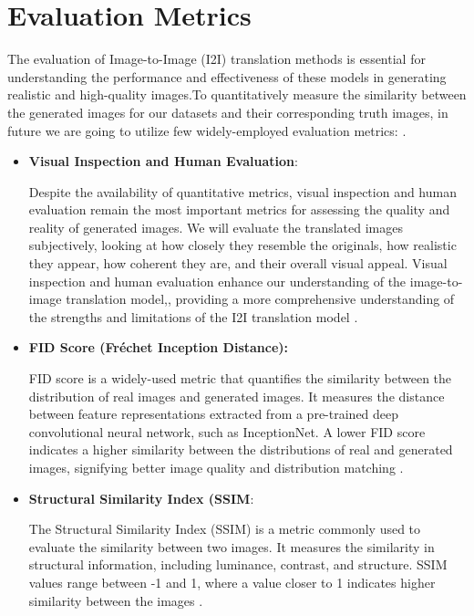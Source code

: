 \documentclass[UKenglish,12pt]{master-style}
\begin{document}
\section{Evaluation Metrics}

The evaluation of Image-to-Image (I2I) translation methods is essential for understanding the performance and effectiveness of these models in generating realistic and high-quality images.To quantitatively measure the similarity between the generated images for our datasets and their corresponding truth images, in future we are going to utilize few widely-employed evaluation metrics: .
\begin{itemize}

\item \textbf{Visual Inspection and Human Evaluation}:

Despite the availability of quantitative metrics, visual inspection and human evaluation remain the most important metrics for assessing the quality and reality of generated images. We will evaluate the translated images subjectively, looking at how closely they resemble the originals, how realistic they appear, how coherent they are, and their overall visual appeal. Visual inspection and human evaluation enhance our understanding of the image-to-image translation model,, providing a more comprehensive understanding of the strengths and limitations of the I2I translation model \cite{I2I} .

\item \textbf{FID Score (Fréchet Inception Distance):}

FID score is a widely-used metric that quantifies the similarity between the distribution of real images and generated images. It measures the distance between feature representations extracted from a pre-trained deep convolutional neural network, such as InceptionNet. A lower FID score indicates a higher similarity between the distributions of real and generated images, signifying better image quality and distribution matching \cite{FID} .

\item \textbf{Structural Similarity Index (SSIM}:

The Structural Similarity Index (SSIM) is a metric commonly used to evaluate the similarity between two images. It measures the similarity in structural information, including luminance, contrast, and structure. SSIM values range between -1 and 1, where a value closer to 1 indicates higher similarity between the images \cite{evaluation} .


\end{itemize}
\end{document}
